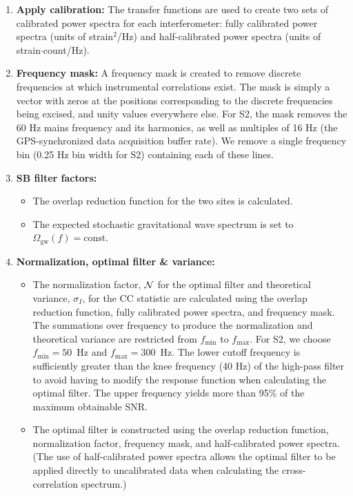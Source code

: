 \begin{enumerate}
\item \textbf{Apply calibration:} 
The transfer functions are used to create two sets of calibrated power
spectra for each interferometer: fully calibrated power spectra (units
of strain$^2$/Hz) and half-calibrated power spectra (units of
strain$\cdot$count/Hz).

\item \textbf{Frequency mask:}
A frequency mask is created to remove discrete frequencies at which
instrumental correlations exist. The mask is simply a vector with zeros
at the positions corresponding to the discrete frequencies being
excised, and unity values everywhere else. For S2, the mask removes the
60 Hz mains frequency and its harmonics, as well as multiples of 16 Hz
(the GPS-synchronized data acquisition buffer rate). We remove a single
frequency bin (0.25 Hz bin width for S2) containing each of these lines.

\item \textbf{SB filter factors:}
\begin{itemize}
\item The overlap reduction function for the two sites is calculated.
\item The expected stochastic gravitational wave spectrum is set to
$\Omega_{\mathrm{gw}}(f)={\mathrm{const}}$.
\end{itemize}

\item \textbf{Normalization, optimal filter \& variance:}
\begin{itemize}
\item The normalization factor, $\cal N$ for the optimal filter and
theoretical variance, $\sigma_I$, for the CC statistic are calculated
using the overlap reduction function, fully calibrated power spectra,
and frequency mask. The summations over frequency to produce the
normalization and theoretical variance are restricted from
$f_{\mathrm{min}}$ to $f_{\mathrm{max}}$. For S2, we choose
$f_{\mathrm{min}} = 50$~Hz and $f_{\mathrm{max}}=300$~Hz. The lower
cutoff frequency is sufficiently greater than the knee frequency (40 Hz)
of the high-pass filter to avoid having to modify the response function
when calculating the optimal filter. The upper frequency yields more
than 95\% of the maximum obtainable SNR.
\item The optimal filter is constructed using the overlap reduction
function, normalization factor, frequency mask, and half-calibrated
power spectra. (The use of half-calibrated power spectra allows the
optimal filter to be applied directly to uncalibrated data when
calculating the cross-correlation spectrum.)
\end{itemize}


\end{enumerate}
